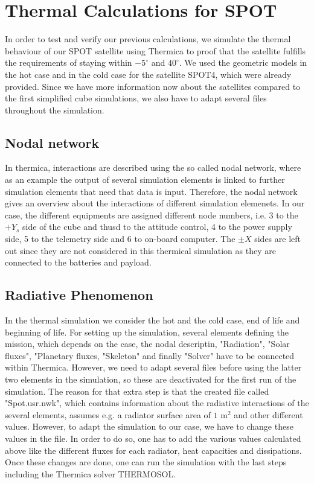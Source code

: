 \section{Thermal Calculations for SPOT}
In order to test and verify our previous calculations, we simulate the thermal behaviour of our SPOT satellite using Thermica to proof that the satellite fulfills the requirements of staying within $-5^{\circ}$ and $40^{\circ}$. We used the geometric models in the hot case and in the cold case for the satellite SPOT4,  which were already provided. Since we have more information now about the satellites compared to the first simplified cube simulations, we also have to adapt several files throughout the simulation. 

\subsection{Nodal network}
In thermica, interactions are described using the so called nodal network, where as an example the output of several simulation elements is linked to further simulation elements that need that data is input. Therefore, the nodal network gives an overview about the interactions of different simulation elemenets. In our case, the different equipments are assigned different node numbers, i.e. 3 to the $+Y_{s}$ side of the cube and thusd to the attitude control, 4 to the power supply side,  5 to the telemetry side and 6 to on-board computer. The $\pm X$ sides are left out since they are not considered in this thermical simulation as they are connected to the batteries and payload.

\subsection{Radiative Phenomenon}
In the thermal simulation we consider the hot and the cold case, end of life and beginning of life. For setting up the simulation, several elements defining the mission, which depends on the case, the nodal descriptin, "Radiation", "Solar fluxes", "Planetary fluxes, "Skeleton" and finally "Solver" have to be connected within Thermica. However, we need to adapt several files before using the latter two elements in the simulation, so these are deactivated for the first run of the simulation.  
The reason for that extra step is that the created file called "Spot.usr.nwk", which contains information about the radiative interactions of the several elements, assumes e.g. a radiator surface area of $1$ m$^{2}$ and other different values. However, to adapt the simulation to our case, we have to change these values in the file. In order to do so, one has to add the various values calculated above like the different fluxes for each radiator, heat capacities and dissipations. Once these changes are done, one can run the simulation with the last steps including the Thermica solver THERMOSOL.

